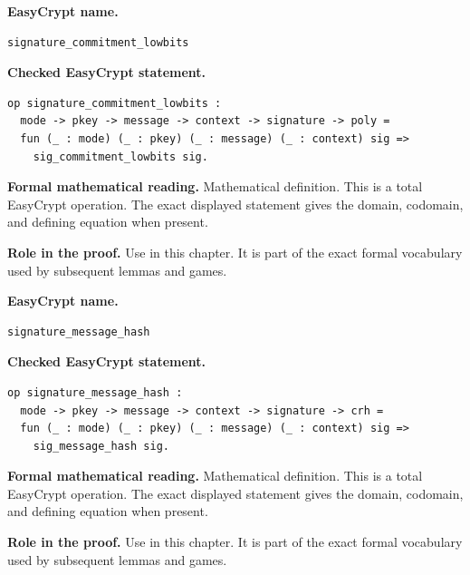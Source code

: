 \begin{formaldefinition}
\noindent\textbf{EasyCrypt name.}
\begin{lstlisting}[language=EasyCrypt,basicstyle=\ttfamily\scriptsize]
signature_commitment_lowbits
\end{lstlisting}
\noindent\textbf{Checked EasyCrypt statement.}
\begin{lstlisting}[language=EasyCrypt,basicstyle=\ttfamily\scriptsize]
op signature_commitment_lowbits :
  mode -> pkey -> message -> context -> signature -> poly =
  fun (_ : mode) (_ : pkey) (_ : message) (_ : context) sig =>
    sig_commitment_lowbits sig.
\end{lstlisting}
\noindent\textbf{Formal mathematical reading.}
Mathematical definition. This is a total EasyCrypt operation.  The exact displayed statement gives the domain, codomain, and defining equation when present.

\noindent\textbf{Role in the proof.}
Use in this chapter. It is part of the exact formal vocabulary used by subsequent lemmas and games.

\end{formaldefinition}

\begin{formaldefinition}
\noindent\textbf{EasyCrypt name.}
\begin{lstlisting}[language=EasyCrypt,basicstyle=\ttfamily\scriptsize]
signature_message_hash
\end{lstlisting}
\noindent\textbf{Checked EasyCrypt statement.}
\begin{lstlisting}[language=EasyCrypt,basicstyle=\ttfamily\scriptsize]
op signature_message_hash :
  mode -> pkey -> message -> context -> signature -> crh =
  fun (_ : mode) (_ : pkey) (_ : message) (_ : context) sig =>
    sig_message_hash sig.
\end{lstlisting}
\noindent\textbf{Formal mathematical reading.}
Mathematical definition. This is a total EasyCrypt operation.  The exact displayed statement gives the domain, codomain, and defining equation when present.

\noindent\textbf{Role in the proof.}
Use in this chapter. It is part of the exact formal vocabulary used by subsequent lemmas and games.

\end{formaldefinition}

